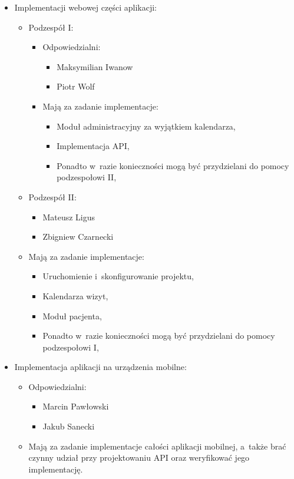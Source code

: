 \begin{itemize}
	\item Implementacji webowej części aplikacji:
	\begin{itemize}
		\item Podzespół I:
		\begin{itemize}
			\item Odpowiedzialni:
			\begin{itemize}
				\item Maksymilian Iwanow
				\item Piotr Wolf
			\end{itemize}
			\item Mają za zadanie implementacje:
			\begin{itemize}
				\item Moduł administracyjny za wyjątkiem kalendarza,
				\item Implementacja API,
				\item Ponadto w~razie konieczności mogą być przydzielani do pomocy podzespołowi II,
			\end{itemize}
		\end{itemize}
		\item Podzespół II:
		\begin{itemize}
			\item Mateusz Ligus
			\item Zbigniew Czarnecki
		\end{itemize}
		\item Mają za zadanie implementacje:
		\begin{itemize}
			\item Uruchomienie i~skonfigurowanie projektu,
			\item Kalendarza wizyt,
			\item Moduł pacjenta,
			\item Ponadto w~razie konieczności mogą być przydzielani do pomocy podzespołowi I,
		\end{itemize}
	\end{itemize}
	\item Implementacja aplikacji na urządzenia mobilne:
	\begin{itemize}
		\item Odpowiedzialni:
		\begin{itemize}
			\item Marcin Pawłowski
			\item Jakub Sanecki
		\end{itemize}
		\item Mają za zadanie implementacje całości aplikacji mobilnej, a~także brać czynny udział przy projektowaniu API oraz weryfikować jego implementację.
	\end{itemize}
\end{itemize}

